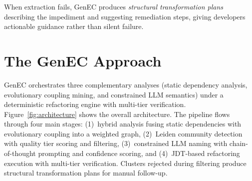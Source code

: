 \documentclass[sigconf]{acmart}
\begin{document}
When extraction fails, GenEC produces \emph{structural transformation plans}
describing the impediment and suggesting remediation steps, giving developers
actionable guidance rather than silent failure.

\section{The GenEC Approach}
\label{sec:approach}

GenEC orchestrates three complementary analyses (static dependency analysis,
evolutionary coupling mining, and constrained LLM semantics) under a
deterministic refactoring engine with multi-tier verification.
Figure~\ref{fig:architecture} shows the overall architecture. The pipeline flows
through four main stages: (1)~hybrid analysis fusing static dependencies with
evolutionary coupling into a weighted graph, (2)~Leiden community detection with
quality tier scoring and filtering, (3)~constrained LLM naming with
chain-of-thought prompting and confidence scoring, and (4)~JDT-based refactoring
execution with multi-tier verification. Clusters rejected during filtering
produce structural transformation plans for manual follow-up.
\end{document}
